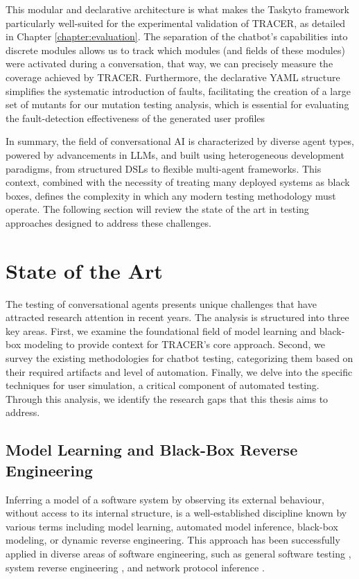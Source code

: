 This modular and declarative architecture
is what makes the Taskyto framework particularly well-suited
for the experimental validation of TRACER,
as detailed in Chapter \ref{chapter:evaluation}.
The separation of the chatbot's capabilities into discrete modules
allows us to track which modules
(and fields of these modules)
were activated during a conversation,
that way, we can precisely measure the coverage
achieved by \ac{TRACER}.
Furthermore, the declarative YAML structure
simplifies the systematic introduction of faults,
facilitating the creation of a large set of mutants
for our mutation testing analysis,
which is essential for evaluating
the fault-detection effectiveness of the generated user profiles

\indent

In summary,
the field of conversational \ac{AI} is characterized by diverse agent types,
powered by advancements in \acp{LLM},
and built using heterogeneous development paradigms,
from structured \acp{DSL} to flexible multi-agent frameworks.
This context, combined with the necessity of treating many deployed systems as black boxes,
defines the complexity in which any modern testing methodology must operate.
The following section will review the state of the art in testing approaches designed to address these challenges.

\section{State of the Art}\label{sec:sota}

The testing of conversational agents presents unique challenges
that have attracted research attention in recent years.
The analysis is structured into three key areas.
First, we examine the foundational field of model learning
and black-box modeling to provide context for TRACER's core approach.
Second, we survey the existing methodologies for chatbot testing,
categorizing them based on their required artifacts and level of automation.
Finally, we delve into the specific techniques for user simulation,
a critical component of automated testing.
Through this analysis, we identify the research gaps that this thesis aims to address.

\subsection{Model Learning and Black-Box Reverse Engineering}

Inferring a model of a software system by observing its external behaviour,
without access to its internal structure,
is a well-established discipline known by various terms including
model learning, automated model inference, black-box modeling, or dynamic reverse engineering.
This approach has been successfully applied in diverse areas of software engineering,
such as general software testing \autocite{aichernigModelLearningModelBased2018},
system reverse engineering \autocite{hajipourIReEnReverseEngineeringBlackBox2021, menguyBlackboxCodeAnalysis2023},
and network protocol inference \autocite{luoDynPREProtocolReverse}.

